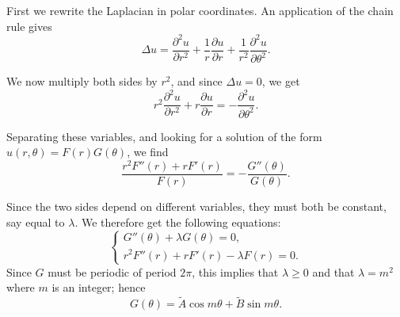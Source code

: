 \begin{sol}
  First we rewrite the Laplacian in polar coordinates.
  An application of the chain rule gives
  \begin{displaymath}
    \Delta u = \frac{\partial^2 u}{\partial r^2} +
    \frac{1}{r}\frac{\partial u}{\partial r} + \frac{1}{r^2}\frac{\partial^2u}{\partial\theta^2}.
  \end{displaymath}

  We now multiply both sides by $r^2$,
  and since $\Delta u=0$, we get
  \begin{displaymath}
    r^2 \frac{\partial^2u}{\partial r^2} + r \frac{\partial u}{\partial r}
    = -\frac{\partial^2 u}{\partial \theta^2}.
  \end{displaymath}

  Separating these variables,
  and looking for a solution of the form $u(r, \theta) = F(r)G(\theta)$,
  we find
  \begin{displaymath}
    \frac{r^2F''(r)+rF'(r)}{F(r)} = -\frac{G''(\theta)}{G(\theta)}.
  \end{displaymath}

  Since the two sides depend on different variables,
  they must both be constant, say equal to $\lambda$.
  We therefore get the following equations:
  \begin{displaymath}
    \begin{cases}
      G''(\theta) + \lambda G(\theta) = 0, \\
      r^2F''(r) + rF'(r) - \lambda F(r) = 0.
    \end{cases}
  \end{displaymath}
  Since $G$ must be periodic of period $2\pi$,
  this implies that $\lambda\ge 0$ and that $\lambda=m^2$
  where $m$ is an integer;
  hence
  \begin{displaymath}
    G(\theta) = \tilde{A}\cos m\theta + \tilde{B}\sin m\theta.
  \end{displaymath}



\end{sol}
